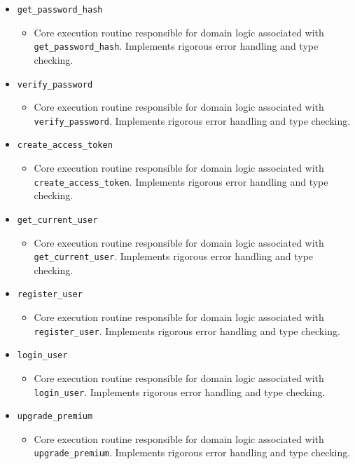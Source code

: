 \documentclass[10pt,journal,compsoc]{IEEEtran}
\begin{document}
\begin{itemize}
    \item \texttt{get\_password\_hash}
    \begin{itemize} \item Core execution routine responsible for domain logic associated with \texttt{get\_password\_hash}. Implements rigorous error handling and type checking. \end{itemize}
    \item \texttt{verify\_password}
    \begin{itemize} \item Core execution routine responsible for domain logic associated with \texttt{verify\_password}. Implements rigorous error handling and type checking. \end{itemize}
    \item \texttt{create\_access\_token}
    \begin{itemize} \item Core execution routine responsible for domain logic associated with \texttt{create\_access\_token}. Implements rigorous error handling and type checking. \end{itemize}
    \item \texttt{get\_current\_user}
    \begin{itemize} \item Core execution routine responsible for domain logic associated with \texttt{get\_current\_user}. Implements rigorous error handling and type checking. \end{itemize}
    \item \texttt{register\_user}
    \begin{itemize} \item Core execution routine responsible for domain logic associated with \texttt{register\_user}. Implements rigorous error handling and type checking. \end{itemize}
    \item \texttt{login\_user}
    \begin{itemize} \item Core execution routine responsible for domain logic associated with \texttt{login\_user}. Implements rigorous error handling and type checking. \end{itemize}
    \item \texttt{upgrade\_premium}
    \begin{itemize} \item Core execution routine responsible for domain logic associated with \texttt{upgrade\_premium}. Implements rigorous error handling and type checking. \end{itemize}

\end{itemize}
\end{document}
